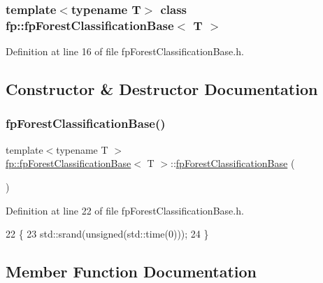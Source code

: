 \subsubsection*{template$<$typename T$>$\newline
class fp\+::fp\+Forest\+Classification\+Base$<$ T $>$}



Definition at line 16 of file fp\+Forest\+Classification\+Base.\+h.



\subsection{Constructor \& Destructor Documentation}
\mbox{\label{classfp_1_1fpForestClassificationBase_a788f11473d1b7c86928d021617a92f2a}} 
\subsubsection{\texorpdfstring{fp\+Forest\+Classification\+Base()}{fpForestClassificationBase()}}
{\footnotesize\ttfamily template$<$typename T $>$ \\
\hyperlink{classfp_1_1fpForestClassificationBase}{fp\+::fp\+Forest\+Classification\+Base}$<$ T $>$\+::\hyperlink{classfp_1_1fpForestClassificationBase}{fp\+Forest\+Classification\+Base} (\begin{DoxyParamCaption}{ }\end{DoxyParamCaption})\hspace{0.3cm}{\ttfamily [inline]}}



Definition at line 22 of file fp\+Forest\+Classification\+Base.\+h.


\begin{DoxyCode}
22                                         \{
23                 std::srand(\textcolor{keywordtype}{unsigned}(std::time(0)));
24             \}
\end{DoxyCode}


\subsection{Member Function Documentation}
\mbox{\label{classfp_1_1fpForestClassificationBase_a696b361df0a1c9aa36687333e2d8111b}} 
